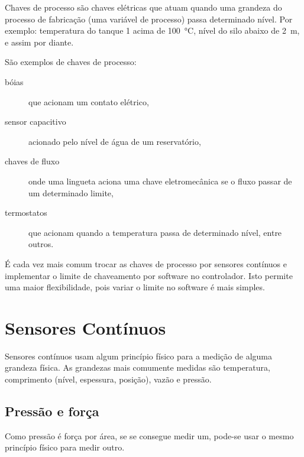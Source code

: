 Chaves de processo são chaves elétricas que atuam quando uma grandeza do processo de fabricação (uma variável de processo) passa determinado nível. Por exemplo: temperatura do tanque 1 acima de \SI{100}{\celsius}, nível do silo abaixo de \SI{2}{\meter}, e assim por diante.

São exemplos de chaves de processo:
\begin{description}
  \item[bóias] que acionam um contato elétrico,
  \item[sensor capacitivo] acionado pelo nível de água de um reservatório,
  \item[chaves de fluxo] onde uma lingueta aciona uma chave eletromecânica se o fluxo passar de um  determinado limite,
  \item[termostatos] que acionam quando a temperatura passa de determinado nível, entre outros.
\end{description}

É cada vez mais comum trocar as chaves de processo por sensores contínuos e implementar o limite de chaveamento por software no controlador. Isto permite uma maior flexibilidade, pois variar o limite no software é mais simples.

\section{Sensores Contínuos}

Sensores contínuos usam algum princípio físico para a medição de alguma grandeza física. As grandezas mais comumente medidas são temperatura, comprimento (nível, espessura, posição), vazão e pressão.

\subsection{Pressão e força}
\label{sub:Pressão e força}
Como pressão é força por área, se se consegue medir um, pode-se usar o mesmo princípio físico para medir outro.

